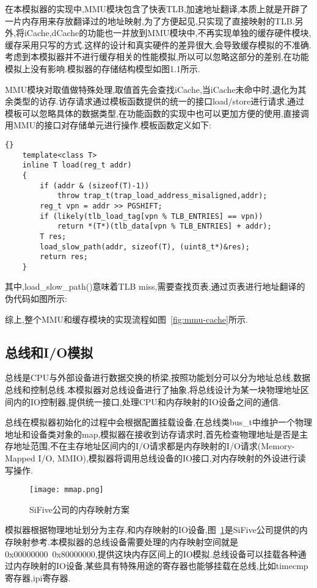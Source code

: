 在本模拟器的实现中,MMU模块包含了快表TLB,加速地址翻译,本质上就是开辟了一片内存用来存放翻译过的地址映射,为了方便起见,只实现了直接映射的TLB.另外,将iCache,dCache的功能也一并放到MMU模块中,不再实现单独的缓存硬件模块,缓存采用只写的方式.这样的设计和真实硬件的差异很大,会导致缓存模拟的不准确.考虑到本模拟器并不进行缓存相关的性能模拟,所以可以忽略这部分的差别,在功能模拟上没有影响.模拟器的存储结构模型如图1.1所示.


MMU模块对取值做特殊处理,取值首先会查找iCache,当iCache未命中时,退化为其余类型的访存.访存请求通过模板函数提供的统一的接口load/store进行请求,通过模板可以忽略具体的数据类型,在功能函数的实现中也可以更加方便的使用,直接调用MMU的接口对存储单元进行操作.模板函数定义如下:
\begin{lstlisting}{}
    template<class T>
    inline T load(reg_t addr)
    {
        if (addr & (sizeof(T)-1))
            throw trap_t(trap_load_address_misaligned,addr);
        reg_t vpn = addr >> PGSHIFT;
        if (likely(tlb_load_tag[vpn % TLB_ENTRIES] == vpn))
            return *(T*)(tlb_data[vpn % TLB_ENTRIES] + addr);
        T res;
        load_slow_path(addr, sizeof(T), (uint8_t*)&res);
        return res;
    }    
\end{lstlisting}


其中,load\_slow\_path()意味着TLB miss,需要查找页表,通过页表进行地址翻译的伪代码如图所示:


综上,整个MMU和缓存模块的实现流程如图~\ref{fig:mmu-cache}所示.


\subsection{总线和I/O模拟}
总线是CPU与外部设备进行数据交换的桥梁,按照功能划分可以分为地址总线,数据总线和控制总线.本模拟器对总线设备进行了抽象,将总线设计为某一块物理地址区间内的IO控制器,提供统一接口,处理CPU和内存映射的IO设备之间的通信.


总线在模拟器初始化的过程中会根据配置挂载设备,在总线类bus\_t中维护一个物理地址和设备类对象的map,模拟器在接收到访存请求时,首先检查物理地址是否是主存地址范围,不在主存地址区间内的I/O请求都是内存映射的I/O请求(Memory-Mapped I/O, MMIO),模拟器将调用总线设备的IO接口,对内存映射的外设进行读写操作.
\begin{figure}[h]
    \centering
    \texttt{[image: mmap.png]}
    \caption{SiFive公司的内存映射方案}
    \label{fig:mmap}
\end{figure}

模拟器根据物理地址划分为主存,和内存映射的IO设备,图~\ref{fig:mmap}是SiFive公司提供的内存映射参考.本模拟器的总线设备需要处理的内存映射空间就是0x00000000~0x80000000,提供这块内存区间上的IO模拟.总线设备可以挂载各种通过内存映射的IO设备,某些具有特殊用途的寄存器也能够挂载在总线,比如timecmp寄存器,ipi寄存器.


